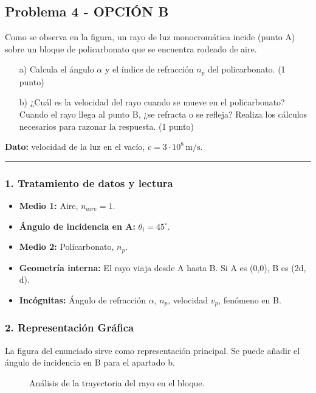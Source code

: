 \subsection{Problema 4 - OPCIÓN B}
\label{subsec:4B_2019_jun_ord}
\begin{cajaenunciado}
Como se observa en la figura, un rayo de luz monocromática incide (punto A) sobre un bloque de policarbonato que se encuentra rodeado de aire.
\begin{enumerate}
    \item[a)] Calcula el ángulo $\alpha$ y el índice de refracción $n_p$ del policarbonato. (1 punto)
    \item[b)] ¿Cuál es la velocidad del rayo cuando se mueve en el policarbonato? Cuando el rayo llega al punto B, ¿se refracta o se refleja? Realiza los cálculos necesarios para razonar la respuesta. (1 punto)
\end{enumerate}
\textbf{Dato:} velocidad de la luz en el vacío, $c=3\cdot10^8\,\text{m/s}$.
\end{cajaenunciado}
\hrule
\subsubsection*{1. Tratamiento de datos y lectura}
\begin{itemize}
    \item \textbf{Medio 1:} Aire, $n_{aire}=1$.
    \item \textbf{Ángulo de incidencia en A:} $\theta_i = 45^\circ$.
    \item \textbf{Medio 2:} Policarbonato, $n_p$.
    \item \textbf{Geometría interna:} El rayo viaja desde A hasta B. Si A es (0,0), B es (2d, d).
    \item \textbf{Incógnitas:} Ángulo de refracción $\alpha$, $n_p$, velocidad $v_p$, fenómeno en B.
\end{itemize}
\subsubsection*{2. Representación Gráfica}
La figura del enunciado sirve como representación principal. Se puede añadir el ángulo de incidencia en B para el apartado b.
\begin{figure}[H]
    \centering
    \caption{Análisis de la trayectoria del rayo en el bloque.}
\end{figure}
